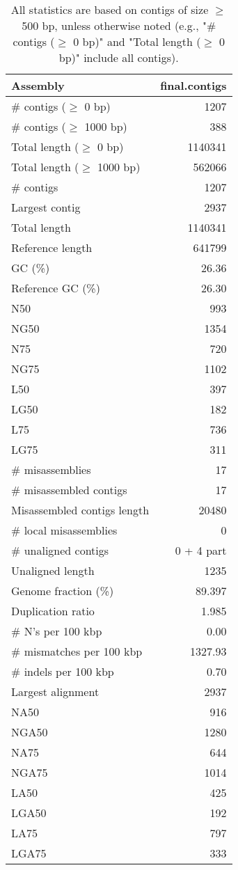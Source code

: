 \documentclass[12pt,a4paper]{article}
\begin{document}
\begin{table}[ht]
\begin{center}
\caption{All statistics are based on contigs of size $\geq$ 500 bp, unless otherwise noted (e.g., "\# contigs ($\geq$ 0 bp)" and "Total length ($\geq$ 0 bp)" include all contigs).}
\begin{tabular}{|l*{1}{|r}|}
\hline
Assembly & final.contigs \\ \hline
\# contigs ($\geq$ 0 bp) & 1207 \\ \hline
\# contigs ($\geq$ 1000 bp) & 388 \\ \hline
Total length ($\geq$ 0 bp) & 1140341 \\ \hline
Total length ($\geq$ 1000 bp) & 562066 \\ \hline
\# contigs & 1207 \\ \hline
Largest contig & 2937 \\ \hline
Total length & 1140341 \\ \hline
Reference length & 641799 \\ \hline
GC (\%) & 26.36 \\ \hline
Reference GC (\%) & 26.30 \\ \hline
N50 & 993 \\ \hline
NG50 & 1354 \\ \hline
N75 & 720 \\ \hline
NG75 & 1102 \\ \hline
L50 & 397 \\ \hline
LG50 & 182 \\ \hline
L75 & 736 \\ \hline
LG75 & 311 \\ \hline
\# misassemblies & 17 \\ \hline
\# misassembled contigs & 17 \\ \hline
Misassembled contigs length & 20480 \\ \hline
\# local misassemblies & 0 \\ \hline
\# unaligned contigs & 0 + 4 part \\ \hline
Unaligned length & 1235 \\ \hline
Genome fraction (\%) & 89.397 \\ \hline
Duplication ratio & 1.985 \\ \hline
\# N's per 100 kbp & 0.00 \\ \hline
\# mismatches per 100 kbp & 1327.93 \\ \hline
\# indels per 100 kbp & 0.70 \\ \hline
Largest alignment & 2937 \\ \hline
NA50 & 916 \\ \hline
NGA50 & 1280 \\ \hline
NA75 & 644 \\ \hline
NGA75 & 1014 \\ \hline
LA50 & 425 \\ \hline
LGA50 & 192 \\ \hline
LA75 & 797 \\ \hline
LGA75 & 333 \\ \hline
\end{tabular}
\end{center}
\end{table}
\end{document}
